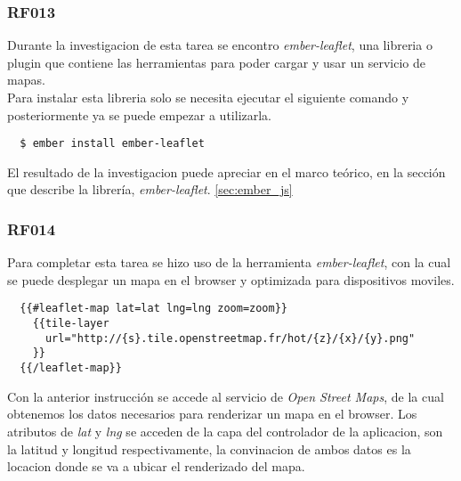 \subsubsection{RF013}
\label{subs:RF013}

Durante la investigacion de esta tarea se encontro \emph{ember-leaflet}, una libreria o plugin que contiene las herramientas para poder cargar y usar un servicio de mapas.\\

Para instalar esta libreria solo se necesita ejecutar el siguiente comando y posteriormente ya se puede empezar a utilizarla.\\

\begin{verbatim}
  $ ember install ember-leaflet
\end{verbatim}

El resultado de la investigacion puede apreciar en el marco teórico, en la sección que describe la librería, \emph{ember-leaflet}. \ref{sec:ember_js}

\subsubsection{RF014}
\label{subs:RF014}


Para completar esta tarea se hizo uso de la herramienta \emph{ember-leaflet}, con la cual se puede desplegar un mapa en el browser y optimizada para dispositivos moviles.\\

\begin{verbatim}
  {{#leaflet-map lat=lat lng=lng zoom=zoom}}
    {{tile-layer
      url="http://{s}.tile.openstreetmap.fr/hot/{z}/{x}/{y}.png"
    }}
  {{/leaflet-map}}
\end{verbatim}

Con la anterior instrucción se accede al servicio de \emph{Open Street Maps}, de la cual obtenemos los datos necesarios para renderizar un mapa en el browser. Los atributos de \emph{lat} y \emph{lng} se acceden de la capa del controlador de la aplicacion, son la latitud y longitud respectivamente, la convinacion de ambos datos es la locacion donde se va a ubicar el renderizado del mapa.\\

%

